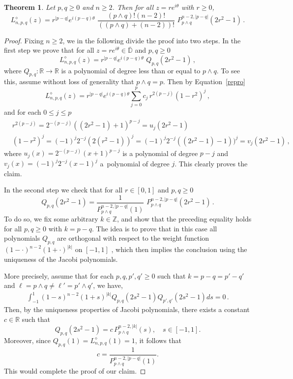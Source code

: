 \documentclass[12pt]{amsart}
\numberwithin{subsection}{section}
\newtheorem{theorem}{Theorem}[section]
\theoremstyle{definition}
\theoremstyle{remark}
\begin{document}
\begin{theorem} \label{Koornwinder}
  Let  $p,q \geq 0 $ and  $n \geq 2 $. Then for all  $z = r e^{i \theta} $ with  $r\geq0 $,
  \[
  L^{\diamond}_{n,p,q}(z) = r^{|p-q|}  e^{i(p-q)\theta}
  \,\,
  \frac{(p\wedge q)!(n-2)!}{((p\wedge q) + (n-2))!}
  \,\,
  P_{p\wedge q}^{n-2,|p-q|}(2r^2 -1)\,.
  \]
\end{theorem}


\begin{proof}
Fixing  $n \geq 2$, we   in the following  divide the proof  into two steps.  In the first step we prove that for all  $z = re^{i\theta} \in \overline{\mathbb{D}} $  and  $p,q \ge 0$
  \[
  L^{\diamond}_{n,p,q}(z) = r^{|p-q|}  e^{i(p-q)\theta}
  \,\,
  Q_{p,q}(2r^2 -1) \,,
  \]
 where   $Q_{p,q}: \mathbb{R} \to \mathbb{R} $  is a polynomial  of degree
  less than or equal to $ p \wedge q  $.
  To see this, assume  without loss of generality  that  $p \wedge q = p $.
Then by Equation~\eqref{repro}
  \begin{equation*}
  L_{n,p,q}^{\diamond} (z) =  r^{|p-q|}  e^{i (p-q)\theta}
    \sum_{j=0}^{p}c_j \,r^{2(p-j)}
    (1-r^2)^j  \,,
 \end{equation*}
 and for each  $0 \leq j \leq p $
 \begin{align*}
   &
   r^{2(p-j)} = 2^{-(p-j)}((2r^2 -1)+1)^{p-j} = u_j(2r^2 -1)
   \\&
   (1-r^2)^j
    = (-1)^j 2^{-j}(2(r^2-1))^j = (-1)^j 2^{-j}((2r^2-1)-1))^j =v_j(2r^2 -1)\,,
     \end{align*}
 where  $u_j(x) = 2^{-(p-j)}(x+1)^{p-j} $ is a polynomial of degree  $ p-j $
 and  $v_j(x) = (-1)^j 2^{-j}(x-1)^{j} $ a~polynomial of degree  $ j $.  This clearly proves the claim.




  In the second step we  check that   for all  $r \in [0,1] $ and $p,q \ge 0 $
  \[
  Q_{p,q}(2r^2 -1) = \frac{1}{P_{p\wedge q}^{n-2,|p-q|}(1)}\,\, P_{p\wedge q}^{n-2,|p-q|}(2r^2 -1)\,.
  \]
  To do so, we fix some  arbitrary $k \in \mathbb{Z} $,  and
  show that the preceding  equality holds
  for all  $p,q \ge 0 $ with $k = p-q$.  The idea is to
  prove that in this case all  polynomials $Q_{p,q}$ are
  orthogonal with respect to the weight function
 $ (1-\pmb{\cdot})^{n-2}(1+ \pmb{\cdot})^{|k|}$  on  $[-1,1]$ , which then implies the conclusion using the uniqueness of the Jacobi polynomials.

 More precisely,  assume that for each  $p,q,p',q' \ge 0$
 such that $k = p-q=p'-q'$ and
 $\ell = p\wedge q \neq \ell' = p'\wedge q' $,
 we have,
  \begin{align} \label{koorwin}
    \int_{-1}^{1}  (1-s)^{n-2}(1+s)^{|k|} Q_{p,q}(2s^2 -1)  Q_{p',q'}(2s^2 -1) ds = 0\,.
  \end{align}
Then, by the uniqueness properties of Jacobi polynomials, there exists a constant $c \in \mathbb{R}$ such that
\[
Q_{p,q}(2s^2 -1) = c \, P_{p \wedge q}^{n-2, |k|}(s), \quad s \in [-1,1].
\]
Moreover, since $Q_{p,q}(1) = L_{n,p,q}^{\diamond}(1) = 1$, it follows that
\[
c = \frac{1}{P_{p \wedge q}^{n-2, |p-q|}(1)}.
\]
  This would complete the proof of our claim.


\end{proof}
\end{document}
